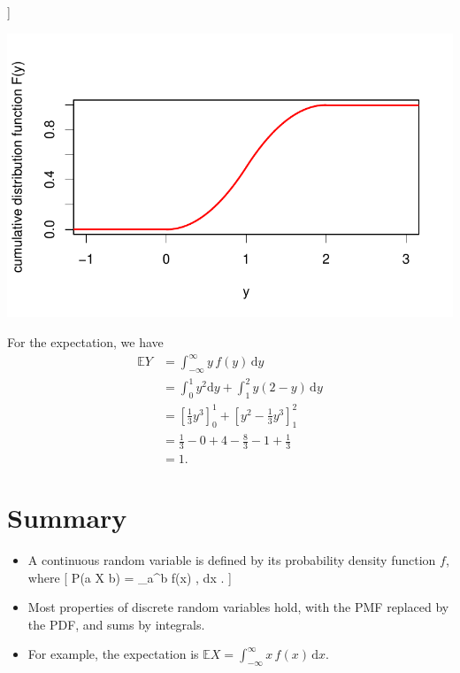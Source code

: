 \documentclass[
  letterpaper,
  DIV=11,
  numbers=noendperiod]{scrreprt}
\providecommand{\tightlist}{%
  \setlength{\itemsep}{0pt}\setlength{\parskip}{0pt}}\usepackage{longtable,booktabs,array}
\theoremstyle{remark}
\begin{document}
{]}

\includegraphics{sections/L15-continuous_files/figure-pdf/second-cdf-1.pdf}

For the expectation, we have \begin{align*}
\mathbb EY &= \int_{-\infty}^{\infty} y\, f(y) \, \mathrm dy \\
  &= \int_0^1 y^2 \mathrm dy + \int_1^2 y(2 - y)\, \mathrm dy \\
  &= \left[ \tfrac13 y^3 \right]_0^1 + \left[  y^2 - \tfrac13 y^3 \right]_1^2 \\
  &= \tfrac13 - 0 + 4 - \tfrac83 - 1 + \tfrac13 \\
  &= 1 .
\end{align*}

\hypertarget{summary-L15}{%
\section*{Summary}\label{summary-L15}}


\begin{itemize}
\tightlist
\item
  A continuous random variable is defined by its probability density
  function \(f\), where {[} \mathbb P(a \leq X \leq b) = \int\_a\^{}b
  f(x) , \mathrm dx . {]}
\item
  Most properties of discrete random variables hold, with the PMF
  replaced by the PDF, and sums by integrals.
\item
  For example, the expectation is
  \(\mathbb EX = \displaystyle\int_{-\infty}^\infty x\, f(x) \, \mathrm dx\).
\end{itemize}
\end{document}
